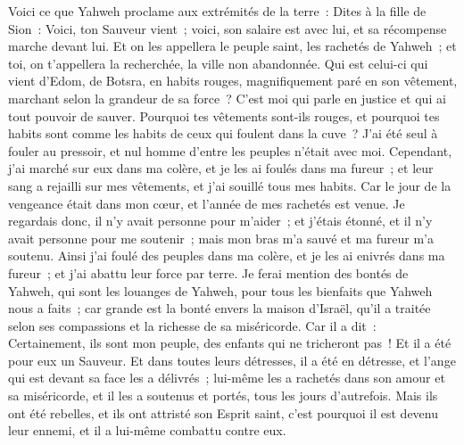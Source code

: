 \begin{multicols}{2}
Voici ce que Yahweh proclame aux extrémités de la terre~: Dites à la fille de Sion~: Voici, ton Sauveur vient~; voici, son salaire est avec lui, et sa récompense marche devant lui.
Et on les appellera le peuple saint, les rachetés de Yahweh~; et toi, on t'appellera la recherchée, la ville non abandonnée.
\VerseOne{}Qui est celui-ci qui vient d'Edom, de Botsra, en habits rouges, magnifiquement paré en son vêtement, marchant selon la grandeur de sa force~? C'est moi qui parle en justice et qui ai tout pouvoir de sauver.
Pourquoi tes vêtements sont-ils rouges, et pourquoi tes habits sont comme les habits de ceux qui foulent dans la cuve~?
J'ai été seul à fouler au pressoir, et nul homme d'entre les peuples n'était avec moi. Cependant, j'ai marché sur eux dans ma colère, et je les ai foulés dans ma fureur~; et leur sang a rejailli sur mes vêtements, et j'ai souillé tous mes habits.
Car le jour de la vengeance était dans mon cœur, et l'année de mes rachetés est venue.
Je regardais donc, il n'y avait personne pour m'aider~; et j'étais étonné, et il n'y avait personne pour me soutenir~; mais mon bras m'a sauvé et ma fureur m'a soutenu.
Ainsi j'ai foulé des peuples dans ma colère, et je les ai enivrés dans ma fureur~; et j'ai abattu leur force par terre.
Je ferai mention des bontés de Yahweh, qui sont les louanges de Yahweh, pour tous les bienfaits que Yahweh nous a faits~; car grande est la bonté envers la maison d'Israël, qu'il a traitée selon ses compassions et la richesse de sa miséricorde.
Car il a dit~: Certainement, ils sont mon peuple, des enfants qui ne tricheront pas~! Et il a été pour eux un Sauveur.
Et dans toutes leurs détresses, il a été en détresse, et l'ange qui est devant sa face les a délivrés~; lui-même les a rachetés dans son amour et sa miséricorde, et il les a soutenus et portés, tous les jours d'autrefois.
Mais ils ont été rebelles, et ils ont attristé son Esprit saint, c'est pourquoi il est devenu leur ennemi, et il a lui-même combattu contre eux.

\end{multicols}
